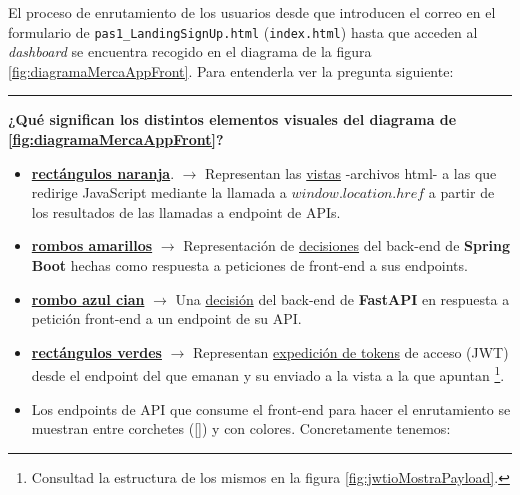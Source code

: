\documentclass[a4paper,12pt]{report}
\begin{document}
	El proceso de enrutamiento de los usuarios desde que introducen el correo en el formulario de \texttt{pas1\_LandingSignUp.html} (\texttt{index.html}) hasta que acceden al \textit{dashboard} se encuentra recogido en el diagrama de la figura \ref{fig:diagramaMercaAppFront}. Para entenderla ver la pregunta siguiente:
	\vspace{1em}
	\hrule
	\textbf{¿Qué significan los distintos elementos visuales del diagrama de \ref{fig:diagramaMercaAppFront}?}
	\begin{itemize}
		\setlength{\itemsep}{-.3em}
		
		\item \textbf{\textcolor{taronjaBrillant}{\underline{rectángulos naranja}}}. $\rightarrow$ Representan las \underline{vistas} -archivos html- a las que redirige JavaScript mediante la llamada a $window.location.href$ a partir de los resultados de las llamadas a endpoint de APIs.
		\item \textbf{\textcolor{yellowfosforito!90!black}{\underline{rombos amarillos}}} $\rightarrow$ Representación de \underline{decisiones} del back-end de \textbf{Spring Boot} hechas como respuesta a peticiones de front-end a sus endpoints.%
		\item \textbf{\textcolor{blauCian}{\underline{rombo azul cian}}} $\rightarrow$ Una \underline{decisión} del back-end de \textbf{FastAPI} en respuesta a petición front-end a un endpoint de su API. 
		
		\item\textbf{\textcolor{green!70!white}{\underline{rectángulos verdes}}} $\rightarrow$ Representan \underline{expedición de tokens} de acceso (JWT) desde el endpoint del que emanan y su enviado a la vista a la que apuntan \footnote{Consultad la estructura de los mismos en la figura \ref{fig:jwtioMostraPayload}.}.
		
		\item Los endpoints de API que consume el front-end para hacer el enrutamiento se muestran entre corchetes ([]) y con colores. Concretamente tenemos:
		

\end{itemize}
\end{document}
